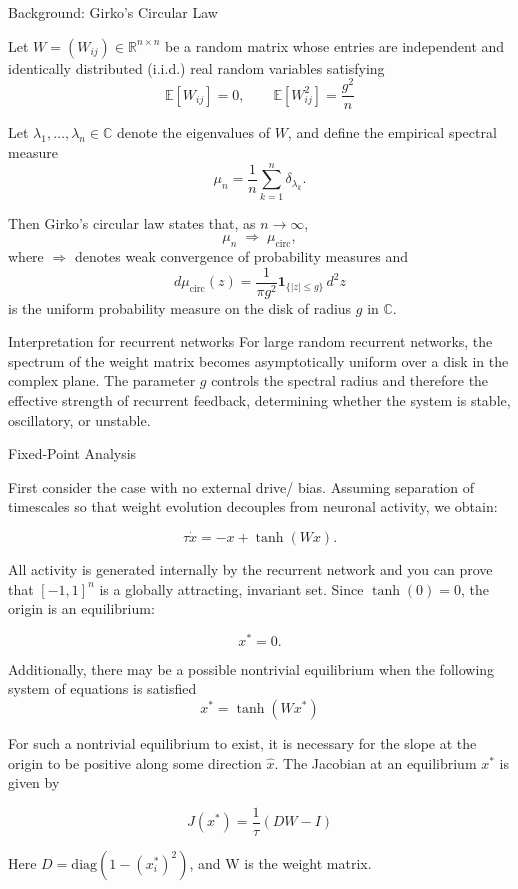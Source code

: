 \documentclass[
11pt,notheorems,hyperref={pdfauthor=whatever}
]{beamer}
\begin{document}
\begin{frame}{Background: Girko's Circular Law}
\small

Let \(W = (W_{ij}) \in \mathbb{R}^{n \times n}\) be a random matrix whose entries are
independent and identically distributed (i.i.d.) real random variables satisfying
\[
\mathbb{E}[W_{ij}] = 0,
\qquad
\mathbb{E}[W_{ij}^2] = \frac{g^2}{n}
\]

Let \(\lambda_1,\dots,\lambda_n \in \mathbb{C}\) denote the eigenvalues of \(W\), and define the empirical spectral measure
\[
\mu_n
=
\frac{1}{n}\sum_{k=1}^n \delta_{\lambda_k}.
\]

Then Girko's circular law states that, as \(n \to \infty\),
\[
\mu_n \;\Rightarrow\; \mu_{\mathrm{circ}},
\]
where \(\Rightarrow\) denotes weak convergence of probability measures and
\[
d\mu_{\mathrm{circ}}(z)
=
\frac{1}{\pi g^2}\mathbf{1}_{\{|z|\le g\}}\, d^2 z
\]
is the uniform probability measure on the disk of radius \(g\) in \(\mathbb{C}\).

\vspace{0.5em}

\begin{block}{Interpretation for recurrent networks}
For large random recurrent networks, the spectrum of the weight matrix becomes asymptotically uniform over a disk in the complex plane. The parameter \(g\) controls the spectral radius and therefore the effective strength of recurrent feedback, determining whether the system is stable, oscillatory, or unstable.
\end{block}
\end{frame}

\begin{frame}{Fixed-Point Analysis}

First consider the case with no external drive/ bias. Assuming separation of timescales so that weight evolution decouples from neuronal activity, we obtain:

\[
\tau \dot{x}
=
-x+\tanh(Wx).
\]

All activity is generated internally by the recurrent network and you can prove that $[-1,1]^n$ is a globally attracting, invariant set. Since
\(\tanh(0)=0\), the origin is an equilibrium:

\[
x^\ast=0.
\]

Additionally, there may be a possible nontrivial equilibrium when the following system of equations is satisfied
\[
x^* = \tanh (W x^*)
\]

For such a nontrivial equilibrium to exist, it is necessary for the slope at the origin to be positive along some direction $\hat{x}$. The Jacobian at an equilibrium $x^*$ is given by

\[
J(x^*) = \frac{1}{\tau}(DW - I)
\]

Here $D = \text{diag} (1 - (x_i^*)^2)$, and W is the weight matrix.

\end{frame}
\end{document}
